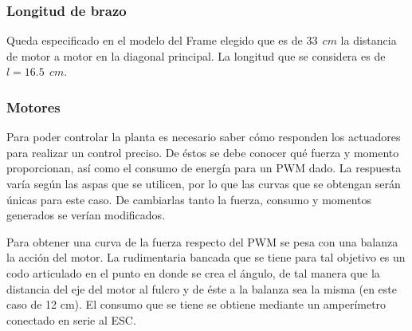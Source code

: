 \documentclass[twoside,11pt]{book}
\begin{document}
\subsubsection*{Longitud de brazo}

Queda especificado en el modelo del Frame elegido que es de $33 \>\> cm$ la distancia de motor a motor en la diagonal principal. La longitud que se considera  es de $l=16.5 \>\> cm$.

\subsubsection*{Motores}
Para poder controlar la planta es necesario saber cómo responden los actuadores para realizar un control preciso. De éstos se debe conocer qué fuerza y momento proporcionan, así como el consumo de energía para un PWM dado. La respuesta varía según las aspas que se utilicen, por lo que las curvas que se obtengan serán únicas para este caso. De cambiarlas tanto la fuerza, consumo y momentos generados se verían modificados.  


Para obtener una curva de la fuerza respecto del PWM se pesa con una balanza la acción del motor. La rudimentaria bancada que se tiene para tal objetivo es un codo articulado en el punto en donde se crea el ángulo, de tal manera que la distancia del eje del motor al fulcro y de éste a la balanza sea la misma (en este caso de 12 cm). El consumo que se tiene se obtiene mediante un amperímetro conectado en serie al ESC.




\end{document}
